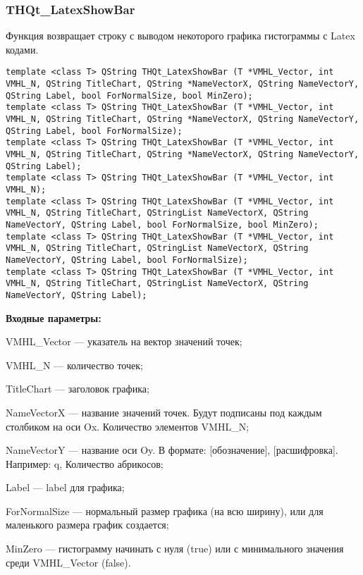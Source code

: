 \documentclass[a4paper,12pt]{article}
\begin{document}
\subsubsection{THQt\_LatexShowBar}\label{THQt_LatexShowBar}

Функция возвращает строку с выводом некоторого графика гистограммы с Latex кодами.


\begin{lstlisting}[label=code_syntax_THQt_LatexShowBar,caption=Синтаксис]
template <class T> QString THQt_LatexShowBar (T *VMHL_Vector, int VMHL_N, QString TitleChart, QString *NameVectorX, QString NameVectorY, QString Label, bool ForNormalSize, bool MinZero);
template <class T> QString THQt_LatexShowBar (T *VMHL_Vector, int VMHL_N, QString TitleChart, QString *NameVectorX, QString NameVectorY, QString Label, bool ForNormalSize);
template <class T> QString THQt_LatexShowBar (T *VMHL_Vector, int VMHL_N, QString TitleChart, QString *NameVectorX, QString NameVectorY, QString Label);
template <class T> QString THQt_LatexShowBar (T *VMHL_Vector, int VMHL_N);
template <class T> QString THQt_LatexShowBar (T *VMHL_Vector, int VMHL_N, QString TitleChart, QStringList NameVectorX, QString NameVectorY, QString Label, bool ForNormalSize, bool MinZero);
template <class T> QString THQt_LatexShowBar (T *VMHL_Vector, int VMHL_N, QString TitleChart, QStringList NameVectorX, QString NameVectorY, QString Label, bool ForNormalSize);
template <class T> QString THQt_LatexShowBar (T *VMHL_Vector, int VMHL_N, QString TitleChart, QStringList NameVectorX, QString NameVectorY, QString Label);
\end{lstlisting}

\textbf{Входные параметры:}
 
    VMHL\_Vector --- указатель на вектор значений точек;
 
    VMHL\_N --- количество точек;
 
    TitleChart --- заголовок графика;
 
    NameVectorX --- название значений точек. Будут подписаны под каждым столбиком на оси Ox. Количество элементов VMHL\_N;
 
    NameVectorY --- название оси Oy. В формате: [обозначение], [расшифровка]. Например: q, Количество абрикосов;
 
    Label --- label для графика;
 
    ForNormalSize --- нормальный размер графика (на всю ширину), или для маленького размера график создается;
 
    MinZero --- гистограмму начинать с нуля (true) или с минимального значения среди VMHL\_Vector (false).
	
\end{document}
